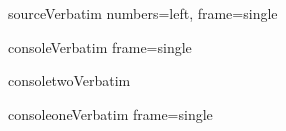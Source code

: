 

\DefineVerbatimEnvironment%
 {source}{Verbatim}
 {numbers=left,
 frame=single}

\newcommand\includesource[1] {
\VerbatimInput[frame=single, numbers=left]
{#1}
}
\newcommand\includesourcenonumbers[1] {
\VerbatimInput[frame=single]
{#1}
}

\newcommand\includesourcenonumberslabel[1] {
\VerbatimInput[frame=single]
{#1}\begin{center}{\texttt{#1}}\end{center}}

\DefineVerbatimEnvironment%
 {console}{Verbatim}
 {frame=single}

\DefineVerbatimEnvironment%
 {consoletwo}{Verbatim}
 {}

\DefineVerbatimEnvironment%
 {consoleone}{Verbatim}
 {frame=single}

\usepackage{atbeginend}


